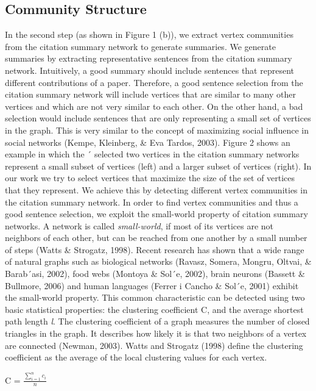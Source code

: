 \subsection{Community Structure}
In the second step (as shown in Figure 1 (b)), we extract vertex communities from the
citation summary network to generate summaries. We generate summaries by extracting
representative sentences from the citation summary network. Intuitively, a good summary
should include sentences that represent different contributions of a paper. Therefore, a good
sentence selection from the citation summary network will include vertices that are similar
to many other vertices and which are not very similar to each other. On the other hand,
a bad selection would include sentences that are only representing a small set of vertices
in the graph. This is very similar to the concept of maximizing social influence in social
networks (Kempe, Kleinberg, \& Eva Tardos, 2003). Figure 2 shows an example in which the ´
selected two vertices in the citation summary networks represent a small subset of vertices
(left) and a larger subset of vertices (right). In our work we try to select vertices that maximize the size of the set of vertices that they represent. We achieve this by detecting
different vertex communities in the citation summary network. In order to find vertex communities and thus a good sentence selection, we exploit the
small-world property of citation summary networks. A network is called \textit{small-world}, if
most of its vertices are not neighbors of each other, but can be reached from one another
by a small number of steps (Watts \& Strogatz, 1998). Recent research has shown that a
wide range of natural graphs such as biological networks (Ravasz, Somera, Mongru, Oltvai,
\& Barab´asi, 2002), food webs (Montoya \& Sol´e, 2002), brain neurons (Bassett \& Bullmore,
2006) and human languages (Ferrer i Cancho \& Sol´e, 2001) exhibit the small-world property.
This common characteristic can be detected using two basic statistical properties: the
clustering coefficient C, and the average shortest path length \textit{l}. The clustering coefficient
of a graph measures the number of closed triangles in the graph. It describes how likely
it is that two neighbors of a vertex are connected (Newman, 2003). Watts and Strogatz
(1998) define the clustering coefficient as the average of the local clustering values for each
vertex.
\begin{center}
C = $\frac{\sum_{i=1}^{n} c_i}{n}$
\end{center}


